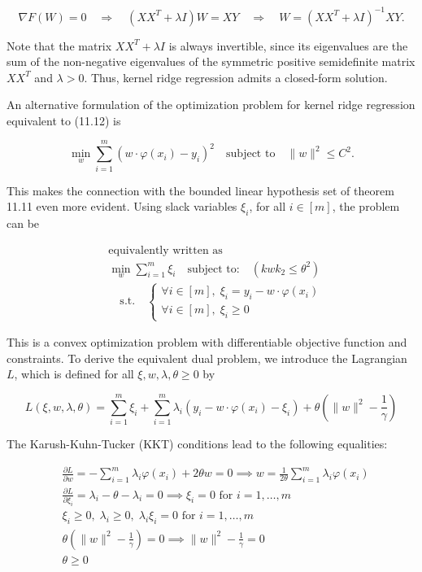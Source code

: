 \documentclass[fleqn,10pt]{olplainarticle}
\begin{document}
\[
\nabla F(W) = 0 \quad \Rightarrow \quad (XX^T + \lambda I)W = XY \quad \Rightarrow \quad W = (XX^T + \lambda I)^{-1}XY. \tag{11.14}
\]

Note that the matrix $XX^T + \lambda I$ is always invertible, since its eigenvalues are the sum of the non-negative eigenvalues of the symmetric positive semidefinite matrix $XX^T$ and $\lambda > 0$. Thus, kernel ridge regression admits a closed-form solution.

An alternative formulation of the optimization problem for kernel ridge regression equivalent to (11.12) is

\[
\min_w \sum_{i=1}^{m} (w \cdot \varphi(x_i) - y_i)^2 \quad \text{subject to} \quad \|w\|^2 \leq C^2. \tag{11.15}
\]

This makes the connection with the bounded linear hypothesis set of theorem 11.11 even more evident. Using slack variables $\xi_i$, for all $i \in [m]$, the problem can be

\begin{align*}
&\text{equivalently written as} \\
&\min_w \sum_{i=1}^{m} \xi_i \quad \text{subject to:} \quad (kwk_2 \leq \theta^2) \\
&\quad \text{s.t.} \quad \begin{cases}
    \forall i \in [m], \; \xi_i = y_i - w \cdot \varphi(x_i) \\
    \forall i \in [m], \; \xi_i \geq 0
\end{cases}
\end{align*}

This is a convex optimization problem with differentiable objective function and constraints. To derive the equivalent dual problem, we introduce the Lagrangian \(L\), which is defined for all \(\xi, w, \lambda, \theta \geq 0\) by

\[
L(\xi, w, \lambda, \theta) = \sum_{i=1}^{m} \xi_i + \sum_{i=1}^{m} \lambda_i (y_i - w \cdot \varphi(x_i) - \xi_i) + \theta \left( \|w\|^2 - \frac{1}{\gamma} \right)
\]

The Karush-Kuhn-Tucker (KKT) conditions lead to the following equalities:

\[
\begin{aligned}
    &\frac{\partial L}{\partial w} = - \sum_{i=1}^{m} \lambda_i \varphi(x_i) + 2 \theta w = 0 \implies w = \frac{1}{2\theta} \sum_{i=1}^{m} \lambda_i \varphi(x_i) \\
    &\frac{\partial L}{\partial \xi_i} = \lambda_i - \theta - \lambda_i = 0 \implies \xi_i = 0 \text{ for } i = 1, \ldots, m \\
    &\xi_i \geq 0, \; \lambda_i \geq 0, \; \lambda_i \xi_i = 0 \text{ for } i = 1, \ldots, m \\
    &\theta \left( \|w\|^2 - \frac{1}{\gamma} \right) = 0 \implies \|w\|^2 - \frac{1}{\gamma} = 0 \\
    &\theta \geq 0
\end{aligned}
\]
\end{document}
